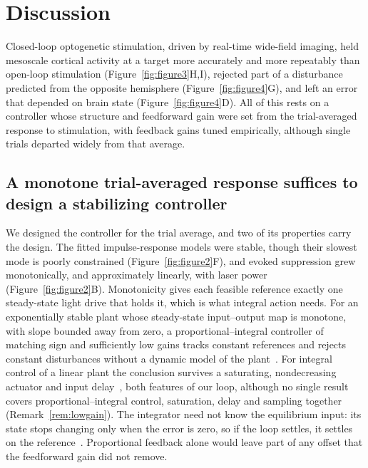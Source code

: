 \section*{Discussion}

Closed-loop optogenetic stimulation, driven by real-time wide-field imaging, held mesoscale cortical activity at a target more accurately and more repeatably than open-loop stimulation (Figure~\ref{fig:figure3}H,I), rejected part of a disturbance predicted from the opposite hemisphere (Figure~\ref{fig:figure4}G), and left an error that depended on brain state (Figure~\ref{fig:figure4}D). All of this rests on a controller whose structure and feedforward gain were set from the trial-averaged response to stimulation, with feedback gains tuned empirically, although single trials departed widely from that average.

\subsection*{A monotone trial-averaged response suffices to design a stabilizing controller}

We designed the controller for the trial average, and two of its properties carry the design. The fitted impulse-response models were stable, though their slowest mode is poorly constrained (Figure~\ref{fig:figure2}F), and evoked suppression grew monotonically, and approximately linearly, with laser power (Figure~\ref{fig:figure2}B). Monotonicity gives each feasible reference exactly one steady-state light drive that holds it, which is what integral action needs. For an exponentially stable plant whose steady-state input--output map is monotone, with slope bounded away from zero, a proportional--integral controller of matching sign and sufficiently low gains tracks constant references and rejects constant disturbances without a dynamic model of the plant~\citep{desoer1985tracking}. For integral control of a linear plant the conclusion survives a saturating, nondecreasing actuator and input delay~\citep{logemann2000absolute}, both features of our loop, although no single result covers proportional--integral control, saturation, delay and sampling together (Remark~\ref{rem:lowgain}). The integrator need not know the equilibrium input: its state stops changing only when the error is zero, so if the loop settles, it settles on the reference~\citep{francis1976internal}. Proportional feedback alone would leave part of any offset that the feedforward gain did not remove.

